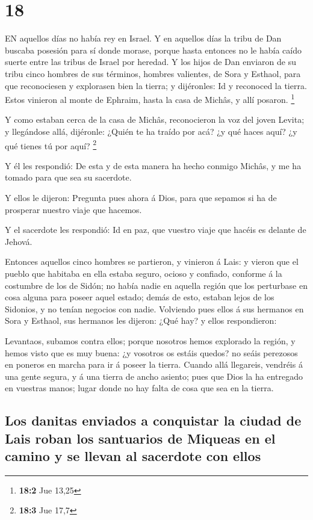 \hypertarget{section-17}{%
\section{18}\label{section-17}}

 EN aquellos días no había rey en Israel. Y en aquellos días
la tribu de Dan buscaba posesión para sí donde morase, porque hasta
entonces no le había caído suerte entre las tribus de Israel por
heredad.  Y los hijos de Dan enviaron de su tribu cinco
hombres de sus términos, hombres valientes, de Sora y Esthaol, para que
reconociesen y explorasen bien la tierra; y dijéronles: Id y reconoced
la tierra. Estos vinieron al monte de Ephraim, hasta la casa de Michâs,
y allí posaron. \footnote{\textbf{18:2} Jue 13,25}

 Y como estaban cerca de la casa de Michâs, reconocieron la
voz del joven Levita; y llegándose allá, dijéronle: ¿Quién te ha traído
por acá? ¿y qué haces aquí? ¿y qué tienes tú por aquí? \footnote{\textbf{18:3}
  Jue 17,7}

 Y él les respondió: De esta y de esta manera ha hecho
conmigo Michâs, y me ha tomado para que sea su sacerdote.

 Y ellos le dijeron: Pregunta pues ahora á Dios, para que
sepamos si ha de prosperar nuestro viaje que hacemos.

 Y el sacerdote les respondió: Id en paz, que vuestro viaje
que hacéis es delante de Jehová.

 Entonces aquellos cinco hombres se partieron, y vinieron á
Lais: y vieron que el pueblo que habitaba en ella estaba seguro, ocioso
y confiado, conforme á la costumbre de los de Sidón; no había nadie en
aquella región que los perturbase en cosa alguna para poseer aquel
estado; demás de esto, estaban lejos de los Sidonios, y no tenían
negocios con nadie.  Volviendo pues ellos á sus hermanos en
Sora y Esthaol, sus hermanos les dijeron: ¿Qué hay? y ellos
respondieron:

 Levantaos, subamos contra ellos; porque nosotros hemos
explorado la región, y hemos visto que es muy buena: ¿y vosotros os
estáis quedos? no seáis perezosos en poneros en marcha para ir á poseer
la tierra.  Cuando allá llegareis, vendréis á una gente
segura, y á una tierra de ancho asiento; pues que Dios la ha entregado
en vuestras manos; lugar donde no hay falta de cosa que sea en la
tierra.

\hypertarget{los-danitas-enviados-a-conquistar-la-ciudad-de-lais-roban-los-santuarios-de-miqueas-en-el-camino-y-se-llevan-al-sacerdote-con-ellos}{%
\subsection{Los danitas enviados a conquistar la ciudad de Lais roban
los santuarios de Miqueas en el camino y se llevan al sacerdote con
ellos}\label{los-danitas-enviados-a-conquistar-la-ciudad-de-lais-roban-los-santuarios-de-miqueas-en-el-camino-y-se-llevan-al-sacerdote-con-ellos}}

